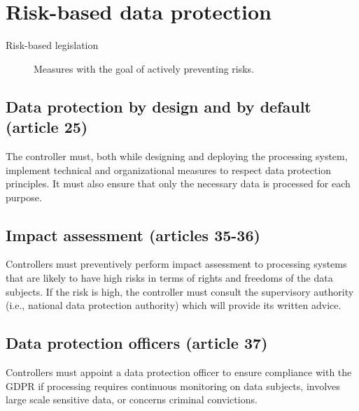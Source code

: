 \section{Risk-based data protection}

\begin{description}
    \item[Risk-based legislation] 
        Measures with the goal of actively preventing risks.
\end{description}


\subsection{Data protection by design and by default (article 25)} 

The controller must, both while designing and deploying the processing system, implement technical and organizational measures to respect data protection principles. It must also ensure that only the necessary data is processed for each purpose.


\subsection{Impact assessment (articles 35-36)} 

Controllers must preventively perform impact assessment to processing systems that are likely to have high risks in terms of rights and freedoms of the data subjects. If the risk is high, the controller must consult the supervisory authority (i.e., national data protection authority) which will provide its written advice.


\subsection{Data protection officers (article 37)} 

Controllers must appoint a data protection officer to ensure compliance with the GDPR if processing requires continuous monitoring on data subjects, involves large scale sensitive data, or concerns criminal convictions.